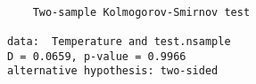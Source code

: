 \begin{verbatim} 

	Two-sample Kolmogorov-Smirnov test

data:  Temperature and test.nsample
D = 0.0659, p-value = 0.9966
alternative hypothesis: two-sided

\end{verbatim}